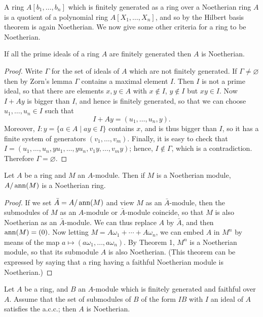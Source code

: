A ring $A[b_1, \ldots, b_n]$ which is finitely generated as a ring over a
Noetherian ring $A$ is a quotient of a polynomial ring $A[X_1, \ldots, X_n]$, and
so by the Hilbert basis theorem is again Noetherian. We now give some
other criteria for a ring to be Noetherian.

\begin{theorem}[I.\,S.\ Cohen]\label{thm:3.4}
If all the prime ideals of a ring $A$ are finitely
generated then $A$ is Noetherian.
\end{theorem}

\begin{proof}
Write $\Gamma$ for the set of ideals of $A$ which are not finitely generated.
If $\Gamma \neq \varnothing$ then by Zorn's lemma $\Gamma$ contains a maximal element $I$. Then $I$ is
not a prime ideal, so that there are elements $x, y \in A$ with $x \notin I$, $y \notin I$ but
$xy \in I$. Now $I + Ay$ is bigger than $I$, and hence is finitely generated, so
that we can choose $u_1, \ldots, u_n \in I$ such that
\[
  I + Ay = (u_1, \ldots, u_n, y).
\]
Moreover, $I:y = \{a \in A \mid ay \in I\}$ contains $x$, and is thus bigger than
$I$, so it has a finite system of generators $(v_1, \ldots, v_m)$. Finally, it is
easy to check that $I = (u_1, \ldots, u_n, yu_1, \ldots, yu_n, v_1y, \ldots, v_my)$; hence, $I \notin \Gamma$, which is a
contradiction. Therefore $\Gamma = \varnothing$.
\end{proof}

\begin{theorem}\label{thm:3.5}
Let $A$ be a ring and $M$ an $A$-module. Then if $M$ is a
Noetherian module, $A/\operatorname{ann}(M)$ is a Noetherian ring.
\end{theorem}

\begin{proof}
If we set $\bar{A} = A/\operatorname{ann}(M)$ and view $M$ as an $\bar{A}$-module, then the
submodules of $M$ as an $A$-module or $\bar{A}$-module coincide, so that $M$ is
also Noetherian as an $\bar{A}$-module. We can thus replace $A$ by $\bar{A}$, and then
$\operatorname{ann}(M) = (0)$. Now letting $M = A\omega_1 + \cdots + A\omega_n$, we can embed $A$ in $M^n$
by means of the map $a \mapsto (a\omega_1, \ldots, a\omega_n)$. By Theorem 1, $M^n$ is a Noetherian
module, so that its submodule $A$ is also Noetherian. (This theorem can
be expressed by saying that a ring having a faithful Noetherian module
is Noetherian.)
\end{proof}

\begin{theorem}\label{thm:3.6}
Let $A$ be a ring, and $B$ an $A$-module
which is finitely generated and faithful over $A$. Assume that the set of
submodules of $B$ of the form $IB$ with $I$ an ideal of $A$ satisfies the a.c.c.;
then $A$ is Noetherian.
\end{theorem}

